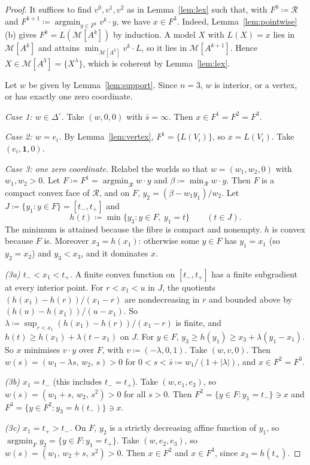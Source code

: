 \documentclass[11pt]{article}
\theoremstyle{remark}
\newcommand{\one}{\mathbf 1}
\newcommand{\Di}{\Delta^{\circ}}
\newcommand{\M}{\mathcal M}
\newcommand{\Rr}{\mathcal R}
\DeclareMathOperator*{\argmin}{argmin}
\begin{document}
\begin{proof}
It suffices to find $v^0,v^1,v^2$ as in Lemma~\ref{lem:lex} such that, with $F^0\coloneqq\Rr$ and $F^{k+1}\coloneqq\argmin_{y\in F^k}v^k\cdot y$, we have $x\in F^3$. Indeed, Lemma~\ref{lem:pointwise}(b) gives $F^k=L(\M[A^k])$ by induction. A model $X$ with $L(X)=x$ lies in $\M[A^k]$ and attains $\min_{\M[A^k]}v^k\cdot L$, so it lies in $\M[A^{k+1}]$. Hence $X\in\M[A^3]=\{X^\lambda\}$, which is coherent by Lemma~\ref{lem:lex}.

Let $w$ be given by Lemma~\ref{lem:support}. Since $n=3$, $w$ is interior, or a vertex, or has exactly one zero coordinate.

\emph{Case 1: $w\in\Di$.} Take $(w,0,0)$ with $\bar s=\infty$. Then $x\in F^1=F^2=F^3$.

\emph{Case 2: $w=e_i$.} By Lemma~\ref{lem:vertex}, $F^1=\{L(V_i)\}$, so $x=L(V_i)$. Take $(e_i,\one,0)$.

\emph{Case 3: one zero coordinate.} Relabel the worlds so that $w=(w_1,w_2,0)$ with $w_1,w_2>0$. Let $F\coloneqq F^1=\argmin_{\Rr}w\cdot y$ and $\beta\coloneqq\min_{\Rr}w\cdot y$. Then $F$ is a compact convex face of $\Rr$, and on $F$, $y_2=(\beta-w_1y_1)/w_2$. Let $J\coloneqq\{y_1:y\in F\}=[t_-,t_+]$ and
\[
h(t)\coloneqq\min\{y_3:y\in F,\ y_1=t\}\qquad(t\in J).
\]
The minimum is attained because the fibre is compact and nonempty. $h$ is convex because $F$ is. Moreover $x_3=h(x_1)$: otherwise some $y\in F$ has $y_1=x_1$ (so $y_2=x_2$) and $y_3<x_3$, and it dominates $x$.

\emph{(3a) $t_-<x_1<t_+$.} A finite convex function on $[t_-,t_+]$ has a finite subgradient at every interior point. For $r<x_1<u$ in $J$, the quotients $(h(x_1)-h(r))/(x_1-r)$ are nondecreasing in $r$ and bounded above by $(h(u)-h(x_1))/(u-x_1)$. So $\lambda\coloneqq\sup_{r<x_1}(h(x_1)-h(r))/(x_1-r)$ is finite, and $h(t)\ge h(x_1)+\lambda(t-x_1)$ on $J$. For $y\in F$, $y_3\ge h(y_1)\ge x_3+\lambda(y_1-x_1)$. So $x$ minimises $v\cdot y$ over $F$, with $v\coloneqq(-\lambda,0,1)$. Take $(w,v,0)$. Then $w(s)=(w_1-\lambda s,\,w_2,\,s)>0$ for $0<s<\bar s\coloneqq w_1/(1+|\lambda|)$, and $x\in F^2=F^3$.

\emph{(3b) $x_1=t_-$} (this includes $t_-=t_+$). Take $(w,e_1,e_3)$, so $w(s)=(w_1+s,\,w_2,\,s^2)>0$ for all $s>0$. Then $F^2=\{y\in F:y_1=t_-\}\ni x$ and $F^3=\{y\in F^2:y_3=h(t_-)\}\ni x$.

\emph{(3c) $x_1=t_+>t_-$.} On $F$, $y_2$ is a strictly decreasing affine function of $y_1$, so $\argmin_Fy_2=\{y\in F:y_1=t_+\}$. Take $(w,e_2,e_3)$, so $w(s)=(w_1,\,w_2+s,\,s^2)>0$. Then $x\in F^2$ and $x\in F^3$, since $x_3=h(t_+)$.
\end{proof}
\end{document}
